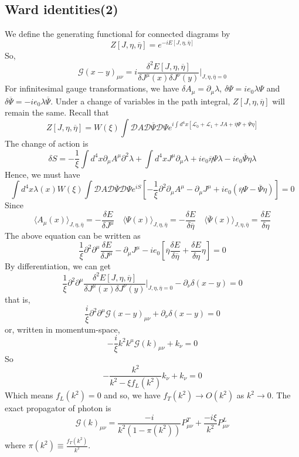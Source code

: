 \subsection{Ward identities(2)}
\noindent
We define the generating functional for connected diagrams by
\[Z[J,\eta,\overline{\eta}] = e^{-iE[J,\eta,\overline{\eta}]}\]
So,
\[\mathcal{G}(x-y)_{\mu\nu} = i  \frac{\delta^2 E[J,\eta,\overline{\eta}]}{\delta J^{\mu}(x) \delta J^{\nu}(y)}\bigg|_{J,\eta,\overline{\eta}=0}\]
For infinitesimal gauge transformations, we have $\delta A_{\mu} = \partial_{\mu} \lambda $, $\delta \Psi = ie_0\lambda\Psi$ and $\delta \overline{\Psi}  = -ie_0 \lambda \overline{\Psi}$. 
Under a change of variables in the path integral, $Z[J,\eta,\overline{\eta}]$ will remain the same. 
Recall that
\[Z[J,\eta,\overline{\eta}] = W(\xi) \int \mathcal{D}A \mathcal{D}\overline{\Psi} \mathcal{D}\Psi e^{i\int d^4x [\mathcal{L}_0 + \mathcal{L}_1 + JA + \overline{\eta}\Psi + \overline{\Psi}\eta]} \]
The change of action is
\[\delta S = -\frac{1}{\xi} \int d^4x \partial_{\mu} A^{\mu} \partial^2 \lambda + \int d^4x J^{\mu}\partial_{\mu}\lambda + ie_0\overline{\eta}\Psi\lambda - ie_0\overline{\Psi}\eta\lambda\]
Hence, we must have
\[\int d^4x \lambda(x) W(\xi)\int \mathcal{D}A \mathcal{D}\overline{\Psi} \mathcal{D}\Psi e^{iS} \left[ -\frac{1}{\xi} \partial^2 \partial_{\mu} A^{\mu} - \partial_{\mu}J^{\mu}  + ie_0(\overline{\eta}\Psi - \overline{\Psi}\eta)\right] = 0 \]
Since
\[\langle A_{\mu}(x) \rangle_{J,\eta,\overline{\eta}} = - \frac{\delta E}{\delta J^{\mu}} \quad \langle \Psi(x) \rangle_{J,\eta,\overline{\eta}} = - \frac{\delta E}{\delta \overline{\eta}} \quad \langle \overline{\Psi}(x) \rangle_{J,\eta,\overline{\eta}} =  \frac{\delta E}{\delta \eta}\]
The above equation can be written as
\[\frac{1}{\xi} \partial^2 \partial^{\mu}\frac{\delta E}{\delta J^{\mu}} - \partial_{\mu}J^{\mu} - ie_0\left[ \overline{\eta}\frac{\delta E}{\delta \overline{\eta}} + \frac{\delta E}{\delta \eta} \eta \right]=0\]
By differentiation, we can get
\[\frac{1}{\xi} \partial^2 \partial^{\mu} \frac{\delta^2 E[J,\eta,\overline{\eta}]}{\delta J^{\mu}(x) \delta J^{\nu}(y)}\bigg|_{J,\eta,\overline{\eta}=0} - \partial_{\nu} \delta(x-y) = 0\]
that is,
\[\frac{i}{\xi}\partial^2 \partial^{\mu} \mathcal{G}(x-y)_{\mu\nu}+ \partial_{\nu} \delta(x-y) = 0 \]
or, written in momentum-space,
\[-\frac{i}{\xi}k^2 k^{\mu} \mathcal{G}(k)_{\mu\nu}+ k_{\nu} = 0\]
So
\[- \frac{k^2}{k^2-\xi f_L(k^2)} k_{\nu} + k_{\nu} = 0\]
Which means $f_L(k^2) =0$ and so, we have $f_T(k^2) \to O(k^2)$ as $k^2 \to 0$. The exact propagator of photon is
\[\mathcal{G}(k)_{\mu\nu} = \frac{-i}{k^2(1-\pi(k^2))}P^T_{\mu\nu} + \frac{-i\xi}{k^2} P^L_{\mu\nu}\]
where $\pi(k^2) \equiv \frac{f_T(k^2)}{k^2}$.

